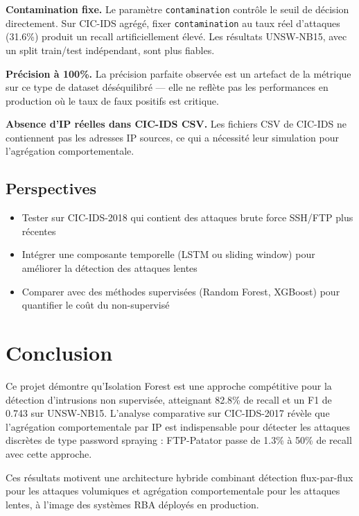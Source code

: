 \documentclass[11pt,a4paper]{article}
\begin{document}
\textbf{Contamination fixe.} Le paramètre \texttt{contamination} contrôle
le seuil de décision directement. Sur CIC-IDS agrégé, fixer
\texttt{contamination} au taux réel d'attaques (31.6\%) produit un recall
artificiellement élevé. Les résultats UNSW-NB15, avec un split train/test
indépendant, sont plus fiables.

\textbf{Précision à 100\%.} La précision parfaite observée est un artefact
de la métrique sur ce type de dataset déséquilibré --- elle ne reflète pas
les performances en production où le taux de faux positifs est critique.

\textbf{Absence d'IP réelles dans CIC-IDS CSV.} Les fichiers CSV de
CIC-IDS ne contiennent pas les adresses IP sources, ce qui a nécessité
leur simulation pour l'agrégation comportementale.

\subsection{Perspectives}

\begin{itemize}
    \item Tester sur CIC-IDS-2018 qui contient des attaques brute force SSH/FTP plus récentes
    \item Intégrer une composante temporelle (LSTM ou sliding window) pour améliorer
          la détection des attaques lentes
    \item Comparer avec des méthodes supervisées (Random Forest, XGBoost) pour
          quantifier le coût du non-supervisé
\end{itemize}

\section{Conclusion}

Ce projet démontre qu'Isolation Forest est une approche compétitive pour la
détection d'intrusions non supervisée, atteignant 82.8\% de recall et un F1
de 0.743 sur UNSW-NB15. L'analyse comparative sur CIC-IDS-2017 révèle que
l'agrégation comportementale par IP est indispensable pour détecter les
attaques discrètes de type password spraying : FTP-Patator passe de 1.3\%
à 50\% de recall avec cette approche.

Ces résultats motivent une architecture hybride combinant détection
flux-par-flux pour les attaques volumiques et agrégation comportementale
pour les attaques lentes, à l'image des systèmes RBA déployés en production.
\end{document}
